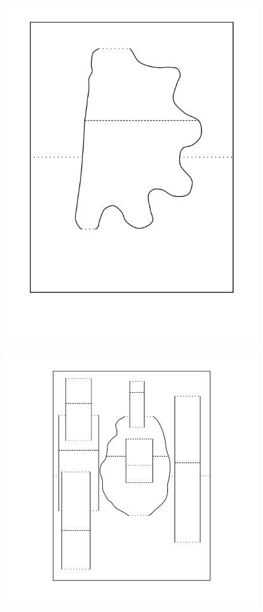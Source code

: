 \begin{figure}[htbp]
\centering
\includegraphics{figures/92_Appendix_Visual_Aids_Materials/lined_card2.png}
\caption{}
\end{figure}

\clearpage

\begin{figure}[htbp]
\centering
\includegraphics{figures/92_Appendix_Visual_Aids_Materials/lined_card3.png}
\caption{}
\end{figure}

